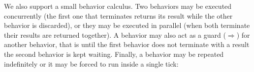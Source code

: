 
We also support a small behavior calculus. Two behaviors may be executed concurrently (the first one that terminates returns its result while the other behavior is discarded), or they may be executed in parallel (when both terminate their results are returned together). A behavior may also act as a guard ($\Rightarrow$) for another behavior, that is until the first behavior does not terminate with a result the second behavior is kept waiting. Finally, a behavior may be repeated indefinitely or it may be forced to run inside a single tick:



